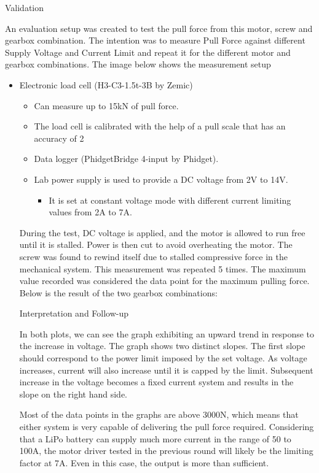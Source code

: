 Validation

An evaluation setup was created to test the pull force from this motor, screw and gearbox combination. The intention was to measure Pull Force against different Supply Voltage and Current Limit and repeat it for the different motor and gearbox combinations.
The image below shows the measurement setup
\begin{itemize}
    \item Electronic load cell (H3-C3-1.5t-3B by Zemic)
        \begin{itemize}
        \item Can measure up to 15kN of pull force. 
        \item The load cell is calibrated with the help of a pull scale that has an accuracy of 2%
\item Data logger (PhidgetBridge 4-input by Phidget). 
\item Lab power supply is used to provide a DC voltage from 2V to 14V. 
        \begin{itemize}
        \item It is set at constant voltage mode with different current limiting values from 2A to 7A. 
        \end{itemize}
    \end{itemize}

During the test, DC voltage is applied, and the motor is allowed to run free until it is stalled. Power is then cut to avoid overheating the motor. The screw was found to rewind itself due to stalled compressive force in the mechanical system. This measurement was repeated 5 times. The maximum value recorded was considered the data point for the maximum pulling force.
Below is the result of the two gearbox combinations:

Interpretation and Follow-up


In both plots, we can see the graph exhibiting an upward trend in response to the increase in voltage. The graph shows two distinct slopes. The first slope should correspond to the power limit imposed by the set voltage. As voltage increases, current will also increase until it is capped by the limit. Subsequent increase in the voltage becomes a fixed current system and results in the slope on the right hand side.

Most of the data points in the graphs are above 3000N, which means that either system is very capable of delivering the pull force required. Considering that a LiPo battery can supply much more current in the range of 50 to 100A, the motor driver tested in the previous round will likely be the limiting factor at 7A. Even in this case, the output is more than sufficient. 


\end{itemize}
